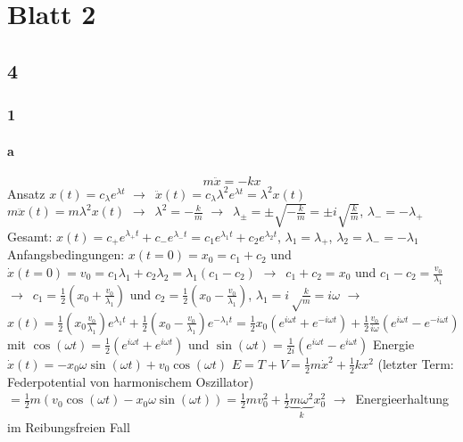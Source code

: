 \documentclass[oneside]{book}
\theoremstyle{definition}
\newcommand{\conseq}{$\rightarrow$~}
\begin{document}
\section{Blatt 2}

\subsection{4}
\subsubsection{1}
\paragraph{a}
$$m \ddot{x} = -kx$$
Ansatz $x(t) = c_\lambda e^{\lambda t}$ \conseq $\ddot{x}(t) = c_\lambda \lambda^2 e^{\lambda t} = \lambda^2 x(t)$\\
$m \ddot{x}(t) = m \lambda^2 x(t)$ \conseq $\lambda^2 = - \frac{k}{m}$
\conseq $\lambda_{\pm} = \pm \sqrt{- \frac{k}{m}} = \pm i \sqrt{\frac{k}{m}}$, $\lambda_{-} = - \lambda_{+}$
Gesamt: $x(t) = c_+ e^{\lambda_+ t} + c_- e^{\lambda_- t} = c_1 e^{\lambda_1 t} + c_2 e^{\lambda_2 t}$, $\lambda_1 = \lambda_+$, $\lambda_2 = \lambda_- = - \lambda_1$
Anfangsbedingungen: $x(t = 0) = x_0 = c_1 + c_2$ und $\dot{x}(t = 0) = v_0 = c_1 \lambda_1 + c_2 \lambda_2 = \lambda_1 (c_1 - c_2) $
\conseq $c_1+c_2 = x_0$ und $c_1 - c_2 = \frac{v_0}{\lambda_1}$
\conseq $c_1 = \frac12 (x_0 + \frac{v_0}{\lambda_1})$ und $c_2 = \frac12 (x_0 - \frac{v_0}{\lambda_1})$, $\lambda_1 = i \sqrt\frac{k}{m} = i \omega$
\conseq $x(t) = \frac{1}{2} (x_0 \frac{v_0}{\lambda_1})e^{\lambda_1 t} + \frac12 (x_0 - \frac{v_0}{\lambda_1})e^{-\lambda_1 t} = \frac{1}{2} x_0 (e^{i \omega t} + e^{-i\omega t}) + \frac12 \frac{v_0}{i\omega}(e^{i \omega t} - e^{-i\omega t})$
mit $\cos(\omega t) = \frac{1}{2} (e^{i \omega t} + e^{i \omega t})$ und $\sin(\omega t) = \frac{1}{2i} (e^{i \omega t} - e^{i \omega t})$
Energie $\dot{x}(t) = - x_0 \omega \sin(\omega t) + v_0 \cos(\omega t)$
$E = T + V = \frac12 m\dot{x}^2 + \frac12 k x^2$ (letzter Term: Federpotential von harmonischem Oszillator)
$ = \frac{1}{2} m (v_0 \cos(\omega t) - x_0 \omega \sin(\omega t)) = \frac{1}{2} m v_0^2 + \frac12 \underbrace{m \omega^2}_{k} x_0^2$ \conseq Energieerhaltung im Reibungsfreien Fall
\end{document}
